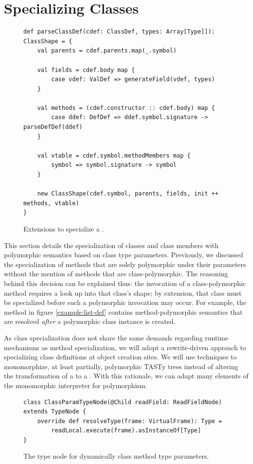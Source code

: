 \newpage 

\section{Specializing Classes}

\begin{figure}[!htb]
\begin{verbatim}
def parseClassDef(cdef: ClassDef, types: Array[Type]]): ClassShape = {
	val parents = cdef.parents.map(_.symbol)
		
	val fields = cdef.body map {
		case vdef: ValDef => generateField(vdef, types)	
	}
	
	val methods = (cdef.constructor :: cdef.body) map {
		case ddef: DefDef => ddef.symbol.signature -> parseDefDef(ddef)
	}
		
	val vtable = cdef.symbol.methodMembers map {
		symbol => symbol.signature -> symbol
	}
		
	new ClassShape(cdef.symbol, parents, fields, init ++ methods, vtable)
}
\end{verbatim}
\caption{Extensions to specialize a .}
\label{impl:specialize-class}
\end{figure}

This section details the specialization of classes and class members with polymorphic semantics based on class type parameters.
Previously, we discussed the specialization of methods that are solely polymorphic under their parameters without the mention of methods that are class-polymorphic.
The reasoning behind this decision can be explained thus: the invocation of a class-polymorphic method requires a look up into that class's shape; by extension, that class must be specialized before such a polymorphic invocation may occur.
For example, the method  in figure \ref{example:list-def} contains method-polymorphic semantics that are resolved \textit{after} a polymorphic class instance is created.

As class specialization does not share the same demands regarding runtime mechanisms as method specialization, we will adopt a rewrite-driven approach to specializing class definitions at object creation sites.
We will use techniques to monomorphize, at least partially, polymorphic TASTy trees instead of altering the transformation of a  to a .
With this rationale, we can adapt many elements of the monomorphic interpreter for polymorphism.

\begin{figure}[!htb]
\begin{verbatim}
class ClassParamTypeNode(@Child readField: ReadFieldNode) extends TypeNode {
	override def resolveType(frame: VirtualFrame): Type = 
		readLocal.execute(frame).asInstanceOf[Type]
}
\end{verbatim}
\caption{The type node for dynamically class method type parameters.}
\label{impl:class-param-typenode}
\end{figure}

